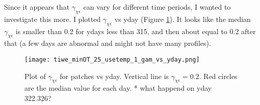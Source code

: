 \documentclass[11pt]{article}
\begin{document}
Since it appears that $\gamma_{\chi\epsilon}$ can vary for different time periods, I wanted to investigate this more. I plotted $\gamma_{\chi\epsilon}$ vs yday (Figure \ref{gamvsyday}). It looks like the median $\gamma_{\chi\epsilon}$ is smaller than 0.2 for ydays less than 315, and then about equal to 0.2 after that (a few days are abnormal and might not have many profiles).

\begin{figure}[htbp]
\texttt{[image: tiwe\_minOT\_25\_usetemp\_1\_gam\_vs\_yday.png]}
\caption{Plot of $\gamma_{\chi\epsilon}$ for patches vs yday. Vertical line is $\gamma_{\chi\epsilon}=0.2$. Red circles are the median value for each day. * what happend on yday 322.326?}
\label{gamvsyday}
\end{figure}
\end{document}
